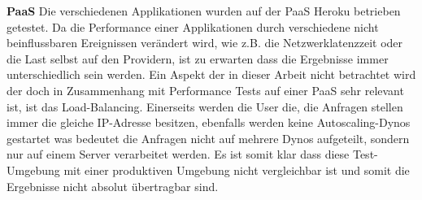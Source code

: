 \documentclass[main.tex]{subfiles}
\begin{document}
\textbf{PaaS}\newline
Die verschiedenen Applikationen wurden auf der PaaS Heroku betrieben getestet. Da die Performance einer Applikationen durch verschiedene nicht beinflussbaren Ereignissen verändert wird, wie z.B. die Netzwerklatenzzeit oder die Last selbst auf den Providern, ist zu erwarten dass die Ergebnisse immer unterschiedlich sein werden. 
Ein Aspekt der in dieser Arbeit nicht betrachtet wird der doch in Zusammenhang mit Performance Tests auf einer PaaS sehr relevant ist, ist das Load-Balancing. Einerseits werden die User die, die Anfragen stellen immer die gleiche IP-Adresse besitzen, ebenfalls werden keine Autoscaling-Dynos gestartet was bedeutet die Anfragen nicht auf mehrere Dynos aufgeteilt, sondern nur auf einem Server verarbeitet werden. Es ist somit klar dass diese Test-Umgebung mit einer produktiven Umgebung nicht vergleichbar ist und somit die Ergebnisse nicht absolut übertragbar sind.
\end{document}
